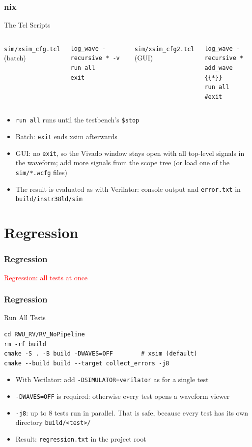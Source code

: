 \documentclass{beamer}
\newcommand{\astitle}{nix}
\newcommand{\assubtitle}{nix}
\newcommand{\cmd}[1]{\texttt{#1}}
\begin{document}
\renewcommand{\assubtitle}{The Tcl Scripts}
\begin{frame}[fragile]
\frametitle{\astitle}
\begin{block}{\assubtitle}
  \begin{columns}[T]
  \cmd{sim/xsim\_cfg.tcl} (batch)
\begin{lstlisting}
log_wave -recursive * -v
run all
exit
\end{lstlisting}
  \cmd{sim/xsim\_cfg2.tcl} (GUI)
\begin{lstlisting}
log_wave -recursive *
add_wave {{*}}
run all
#exit
\end{lstlisting}
  \end{columns}
  \footnotesize
  \begin{itemize}
    \item \cmd{run all} runs until the testbench's \cmd{\$stop}
    \item Batch: \cmd{exit} ends xsim afterwards
    \item GUI: no \cmd{exit}, so the Vivado window stays open with all
      top-level signals in the waveform; add more signals from the scope tree
      (or load one of the \cmd{sim/*.wcfg} files)
    \item The result is evaluated as with Verilator: console output and
      \cmd{error.txt} in \cmd{build/instr38ld/sim}
  \end{itemize}
\end{block}
\end{frame}

\section{Regression}
\renewcommand{\astitle}{Regression}
\begin{frame}
\frametitle{\astitle}
\textcolor{red}{Regression: all tests at once}
\end{frame}

\renewcommand{\assubtitle}{Run All Tests}
\begin{frame}[fragile]
\frametitle{\astitle}
\begin{block}{\assubtitle}
\begin{lstlisting}[style=sh,basicstyle=\ttfamily\small]
cd RWU_RV/RV_NoPipeline
rm -rf build
cmake -S . -B build -DWAVES=OFF        # xsim (default)
cmake --build build --target collect_errors -j8
\end{lstlisting}
  \begin{itemize}
    \item With Verilator: add \cmd{-DSIMULATOR=verilator} as for a single test
    \item \cmd{-DWAVES=OFF} is required: otherwise every test opens a waveform viewer
    \item \cmd{-j8}: up to 8 tests run in parallel. That is safe, because every test
      has its own directory \cmd{build/<test>/}
    \item Result: \cmd{regression.txt} in the project root
  \end{itemize}
\end{block}
\end{frame}
\end{document}
